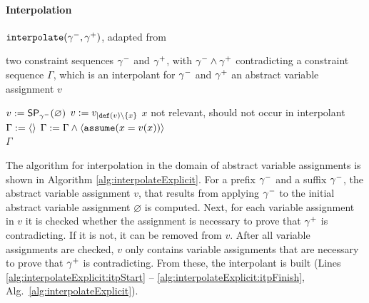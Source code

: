 \paragraph*{Interpolation}
\begin{algorithm}[t]
\caption{$\texttt{interpolate}({\gamma^{-}}, {\gamma^{+}})$, adapted from \cite{Beyer2013}}
\label{alg:interpolateExplicit}
\begin{algorithmic}[1]
\Input two constraint sequences ${\gamma^{-}}$ and ${\gamma^{+}}$, with ${\gamma^{-}} \wedge {\gamma^{+}}$ contradicting
\Output a constraint sequence $\Gamma$, which is an interpolant for ${\gamma^{-}}$ and ${\gamma^{+}}$
\Variables an abstract variable assignment $v$

\State $v := \operatorname{\operatorname{\operatorname{\mathsf{SP}}}}_{\gamma^{-}}(\varnothing)$
		\State $v := v_{|\texttt{def}(v) \setminus \{x\}}$ \Comment $x$ not relevant, should not occur in interpolant
	\EndIf
\EndFor
\State $\Gamma := \langle \rangle$
 \label{alg:interpolateExplicit:itpStart}
	\State $\Gamma := \Gamma \wedge \langle \texttt{assume}(x = v(x))\rangle$
\EndFor\\ \label{alg:interpolateExplicit:itpFinish}
\Return $\Gamma$
\end{algorithmic}
\end{algorithm}

The algorithm for interpolation in the domain of abstract variable assignments is shown in Algorithm \ref{alg:interpolateExplicit}.
For a prefix ${\gamma^{-}}$ and a suffix ${\gamma^{-}}$, the abstract variable assignment $v$, that results from applying ${\gamma^{-}}$ to the initial abstract variable assignment $\varnothing$ is computed.
Next, for each variable assignment in $v$ it is checked whether the assignment is necessary to prove that ${\gamma^{+}}$ is contradicting.
If it is not, it can be removed from $v$.
After all variable assignments are checked, $v$ only contains variable assignments that are necessary to prove that ${\gamma^{+}}$ is contradicting.
From these, the interpolant is built (Lines \ref{alg:interpolateExplicit:itpStart} -- \ref{alg:interpolateExplicit:itpFinish}, Alg.~\ref{alg:interpolateExplicit}).

